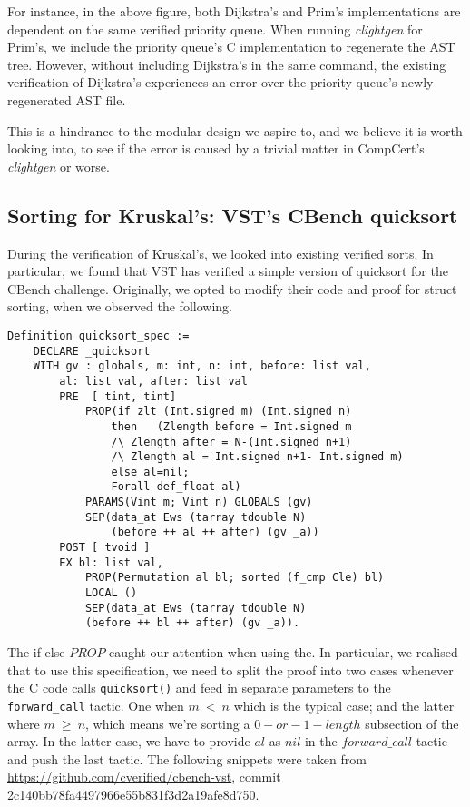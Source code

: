 For instance, in the above figure, both Dijkstra's and Prim's implementations are dependent on the same verified priority queue. When running \textit{clightgen} for Prim's, we include the priority queue's C implementation to regenerate the AST tree. However, without including Dijkstra's in the same command, the existing verification of Dijkstra's experiences an error over the priority queue's newly regenerated AST file.

This is a hindrance to the modular design we aspire to, and we believe it is worth looking into, to see if the error is caused by a trivial matter in CompCert's \textit{clightgen} or worse.

\subsection{Sorting for Kruskal's: VST's CBench quicksort}

During the verification of Kruskal's, we looked into existing verified sorts. In particular, we found that VST has verified a simple version of quicksort for the CBench\cite{DBLP:journals/corr/abs-1904-01009} challenge. Originally, we opted to modify their code and proof for struct sorting, when we observed the following.

\begin{lstlisting}
Definition quicksort_spec :=
	DECLARE _quicksort
	WITH gv : globals, m: int, n: int, before: list val,
		al: list val, after: list val
		PRE  [ tint, tint] 
			PROP(if zlt (Int.signed m) (Int.signed n)
				then   (Zlength before = Int.signed m 
				/\ Zlength after = N-(Int.signed n+1)
				/\ Zlength al = Int.signed n+1- Int.signed m)
				else al=nil;
				Forall def_float al)
			PARAMS(Vint m; Vint n) GLOBALS (gv)
			SEP(data_at Ews (tarray tdouble N) 
				(before ++ al ++ after) (gv _a))
		POST [ tvoid ]
		EX bl: list val,
			PROP(Permutation al bl; sorted (f_cmp Cle) bl) 
			LOCAL ()
			SEP(data_at Ews (tarray tdouble N)
			(before ++ bl ++ after) (gv _a)).
\end{lstlisting}
The if-else $PROP$ caught our attention when using the. In particular, we realised that to use this specification, we need to split the proof into two cases whenever the C code calls \texttt{quicksort()} and feed in separate parameters to the \texttt{forward\_call} tactic. One when $m~<~n$ which is the typical case; and the latter where $m~\geq~n$, which means we're sorting a $0-or-1-length$ subsection of the array. In the latter case, we have to provide $al$ as $nil$ in the $forward\_call$ tactic and push the last tactic. The following snippets were taken from \url{https://github.com/cverified/cbench-vst}, commit 2c140bb78fa4497966e55b831f3d2a19afe8d750.

